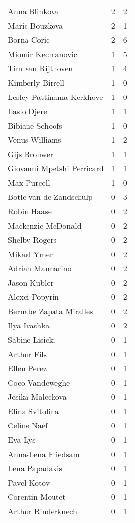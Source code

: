 \begin{longtable}{lrr}
Anna Blinkova & 2 & 2 \\
Marie Bouzkova & 2 & 1 \\
Borna Coric & 2 & 6 \\
Miomir Kecmanovic & 1 & 5 \\
Tim van Rijthoven & 1 & 4 \\
Kimberly Birrell & 1 & 0 \\
Lesley Pattinama Kerkhove & 1 & 0 \\
Laslo Djere & 1 & 1 \\
Bibiane Schoofs & 1 & 0 \\
Venus Williams & 1 & 2 \\
Gijs Brouwer & 1 & 1 \\
Giovanni Mpetshi Perricard & 1 & 1 \\
Max Purcell & 1 & 0 \\
Botic van de Zandschulp & 0 & 3 \\
Robin Haase & 0 & 2 \\
Mackenzie McDonald & 0 & 2 \\
Shelby Rogers & 0 & 2 \\
Mikael Ymer & 0 & 2 \\
Adrian Mannarino & 0 & 2 \\
Jason Kubler & 0 & 2 \\
Alexei Popyrin & 0 & 2 \\
Bernabe Zapata Miralles & 0 & 2 \\
Ilya Ivashka & 0 & 2 \\
Sabine Lisicki & 0 & 1 \\
Arthur Fils & 0 & 1 \\
Ellen Perez & 0 & 1 \\
Coco Vandeweghe & 0 & 1 \\
Jesika Maleckova & 0 & 1 \\
Elina Svitolina & 0 & 1 \\
Celine Naef & 0 & 1 \\
Eva Lys & 0 & 1 \\
Anna-Lena Friedsam & 0 & 1 \\
Lena Papadakis & 0 & 1 \\
Pavel Kotov & 0 & 1 \\
Corentin Moutet & 0 & 1 \\
Arthur Rinderknech & 0 & 1 \\
\end{longtable}
